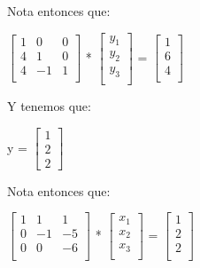 \documentclass[12pt, fleqn]{report}                             %
\def \Eq {equation}                                             %
\newenvironment{MultiLineEquation*}[1]                          %
        {\begin{\Eq*}\begin{alignedat}{#1}}                         %
        {\end{alignedat}\end{\Eq*}}                                 %
\theoremstyle{break}                                            %
\newcommand{\bVector}[1]                                        %
        { \ensuremath{\begin{bmatrix}#1\end{bmatrix}} }             %
\newcommand{\Color}[2]{\textcolor{#1}{#2}}                      %
\newcommand \ColorMatrixA       {Teal700MD}                     %
\newcommand \ColorVecX          {Green700MD}                    %
\newcommand \ColorVecB          {Red700MD}                      %
\begin{document}
            Nota entonces que:
            \begin{MultiLineEquation*}{3}
                \Color{\ColorMatrixA}{
                    \bVector{
                        1 & 0 & 0    \\
                        4 & 1 & 0    \\
                        4 & -1 & 1   \\
                    } 
                }
                *
                \Color{\ColorVecX}{
                    \bVector{
                        y_1  \\
                        y_2  \\
                        y_3  \\
                    }
                }
                =
                \Color{\ColorVecB}{
                    \bVector{
                        1  \\
                        6  \\
                        4  \\
                    }
                }
            \end{MultiLineEquation*}


            Y tenemos que:
            \begin{MultiLineEquation*}{3}
                \vec y = \bVector{
                    1 \\ 2 \\ 2
                }
            \end{MultiLineEquation*}
            
            Nota entonces que:
            \begin{MultiLineEquation*}{3}
                \Color{\ColorMatrixA}{
                    \bVector{
                        1 & 1  & 1    \\
                        0 & -1 & -5  \\
                        0 & 0  & -6   \\
                    } 
                }
                *
                \Color{\ColorVecX}{
                    \bVector{
                        x_1  \\
                        x_2  \\
                        x_3  \\
                    }
                }
                =
                \Color{\ColorVecB}{
                    \bVector{
                        1  \\
                        2  \\
                        2  \\
                    }
                }
            \end{MultiLineEquation*}
\end{document}
